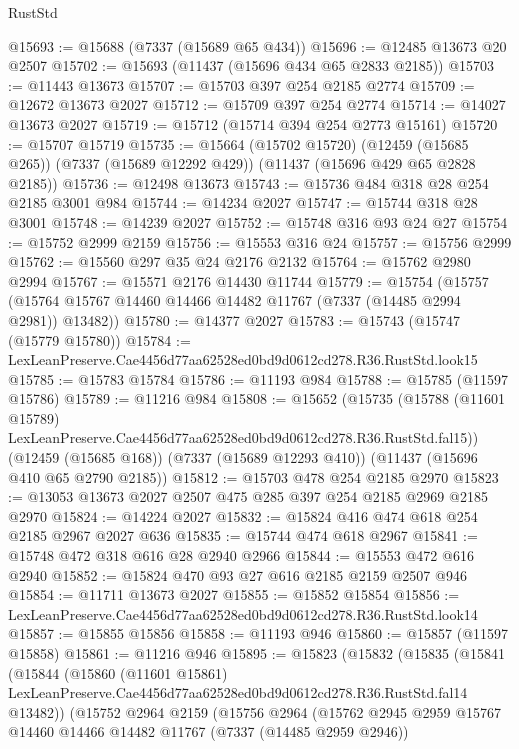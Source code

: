 \begin{lexlean}{RustStd}
\begin{coremodule}
@15693 := @15688 (@7337 (@15689 @65 @434))
@15696 := @12485 @13673 @20 @2507
@15702 := @15693 (@11437 (@15696 @434 @65 @2833 @2185))
@15703 := @11443 @13673
@15707 := @15703 @397 @254 @2185 @2774
@15709 := @12672 @13673 @2027
@15712 := @15709 @397 @254 @2774
@15714 := @14027 @13673 @2027
@15719 := @15712 (@15714 @394 @254 @2773 @15161)
@15720 := @15707 @15719
@15735 := @15664
    (@15702 @15720)
    (@12459 (@15685 @265))
    (@7337 (@15689 @12292 @429))
    (@11437 (@15696 @429 @65 @2828 @2185))
@15736 := @12498 @13673
@15743 := @15736 @484 @318 @28 @254 @2185 @3001 @984
@15744 := @14234 @2027
@15747 := @15744 @318 @28 @3001
@15748 := @14239 @2027
@15752 := @15748 @316 @93 @24 @27
@15754 := @15752 @2999 @2159
@15756 := @15553 @316 @24
@15757 := @15756 @2999
@15762 := @15560 @297 @35 @24 @2176 @2132
@15764 := @15762 @2980 @2994
@15767 := @15571 @2176 @14430 @11744
@15779 := @15754
    (@15757 (@15764 @15767 @14460 @14466 @14482 @11767 (@7337 (@14485 @2994 @2981)) @13482))
@15780 := @14377 @2027
@15783 := @15743 (@15747 (@15779 @15780))
@15784 := LexLeanPreserve.Cae4456d77aa62528ed0bd9d0612cd278.R36.RustStd.look15
@15785 := @15783 @15784
@15786 := @11193 @984
@15788 := @15785 (@11597 @15786)
@15789 := @11216 @984
@15808 := @15652
    (@15735
      (@15788 (@11601 @15789) LexLeanPreserve.Cae4456d77aa62528ed0bd9d0612cd278.R36.RustStd.fal15))
    (@12459 (@15685 @168))
    (@7337 (@15689 @12293 @410))
    (@11437 (@15696 @410 @65 @2790 @2185))
@15812 := @15703 @478 @254 @2185 @2970
@15823 := @13053 @13673 @2027 @2507 @475 @285 @397 @254 @2185 @2969 @2185 @2970
@15824 := @14224 @2027
@15832 := @15824 @416 @474 @618 @254 @2185 @2967 @2027 @636
@15835 := @15744 @474 @618 @2967
@15841 := @15748 @472 @318 @616 @28 @2940 @2966
@15844 := @15553 @472 @616 @2940
@15852 := @15824 @470 @93 @27 @616 @2185 @2159 @2507 @946
@15854 := @11711 @13673 @2027
@15855 := @15852 @15854
@15856 := LexLeanPreserve.Cae4456d77aa62528ed0bd9d0612cd278.R36.RustStd.look14
@15857 := @15855 @15856
@15858 := @11193 @946
@15860 := @15857 (@11597 @15858)
@15861 := @11216 @946
@15895 := @15823
    (@15832
      (@15835
        (@15841
          (@15844
            (@15860
              (@11601 @15861)
              LexLeanPreserve.Cae4456d77aa62528ed0bd9d0612cd278.R36.RustStd.fal14
              @13482))
          (@15752
            @2964
            @2159
            (@15756
              @2964
              (@15762
                @2945
                @2959
                @15767
                @14460
                @14466
                @14482
                @11767
                (@7337 (@14485 @2959 @2946))

\end{coremodule}
\end{lexlean}
